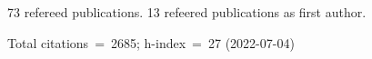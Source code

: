 73 refereed publications. 13 refeered publications as first author.

Total citations~=~2685; h-index~=~27 (2022-07-04)